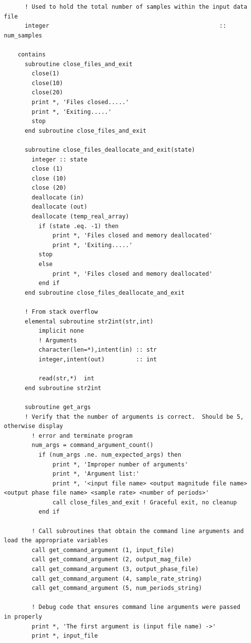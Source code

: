 \begin{verbatim}
      ! Used to hold the total number of samples within the input data file
      integer                                                 :: num_samples
         
    contains
      subroutine close_files_and_exit
        close(1)
        close(10)
        close(20)
        print *, 'Files closed.....'
        print *, 'Exiting.....'
        stop
      end subroutine close_files_and_exit
      
      subroutine close_files_deallocate_and_exit(state)
        integer :: state
        close (1)
        close (10)
        close (20)
        deallocate (in)
        deallocate (out)
        deallocate (temp_real_array)
          if (state .eq. -1) then
              print *, 'Files closed and memory deallocated'
              print *, 'Exiting.....'
          stop
          else
              print *, 'Files closed and memory deallocated'
          end if
      end subroutine close_files_deallocate_and_exit
      
      ! From stack overflow
      elemental subroutine str2int(str,int)
          implicit none
          ! Arguments
          character(len=*),intent(in) :: str
          integer,intent(out)         :: int
  
          read(str,*)  int
      end subroutine str2int
      
      subroutine get_args
      ! Verify that the number of arguments is correct.  Should be 5, otherwise display
        ! error and terminate program
        num_args = command_argument_count()
          if (num_args .ne. num_expected_args) then
              print *, 'Improper number of arguments'
              print *, 'Argument list:'
              print *, '<input file name> <output magnitude file name> <output phase file name> <sample rate> <number of periods>' 
              call close_files_and_exit	! Graceful exit, no cleanup  
          end if
        
        ! Call subroutines that obtain the command line arguments and load the appropriate variables
        call get_command_argument (1, input_file)
        call get_command_argument (2, output_mag_file)
        call get_command_argument (3, output_phase_file)
        call get_command_argument (4, sample_rate_string)
        call get_command_argument (5, num_periods_string)
        
        ! Debug code that ensures command line arguments were passed in properly
        print *, 'The first argument is (input file name) ->'
        print *, input_file
        

\end{verbatim}
